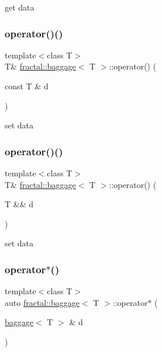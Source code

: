 get data 

\mbox{\label{classfractal_1_1baggage_a3c94a35a361859fd455047a044213d01}} 
\subsubsection{\texorpdfstring{operator()()}{operator()()}\hspace{0.1cm}{\footnotesize\ttfamily [2/3]}}
{\footnotesize\ttfamily template$<$class T$>$ \\
T\& \hyperlink{classfractal_1_1baggage}{fractal\+::baggage}$<$ T $>$\+::operator() (\begin{DoxyParamCaption}\item[{const T \&}]{d }\end{DoxyParamCaption})\hspace{0.3cm}{\ttfamily [inline]}}



set data 

\mbox{\label{classfractal_1_1baggage_a25086cfca4ea2ec94e9ee8965ce335c8}} 
\subsubsection{\texorpdfstring{operator()()}{operator()()}\hspace{0.1cm}{\footnotesize\ttfamily [3/3]}}
{\footnotesize\ttfamily template$<$class T$>$ \\
T\& \hyperlink{classfractal_1_1baggage}{fractal\+::baggage}$<$ T $>$\+::operator() (\begin{DoxyParamCaption}\item[{T \&\&}]{d }\end{DoxyParamCaption})\hspace{0.3cm}{\ttfamily [inline]}}



set data 

\mbox{\label{classfractal_1_1baggage_a65ff2c9d0b95c75913145564c916bb4e}} 
\subsubsection{\texorpdfstring{operator$\ast$()}{operator*()}\hspace{0.1cm}{\footnotesize\ttfamily [1/3]}}
{\footnotesize\ttfamily template$<$class T$>$ \\
auto \hyperlink{classfractal_1_1baggage}{fractal\+::baggage}$<$ T $>$\+::operator$\ast$ (\begin{DoxyParamCaption}\item[{\hyperlink{classfractal_1_1baggage}{baggage}$<$ T $>$ \&}]{d }\end{DoxyParamCaption})\hspace{0.3cm}{\ttfamily [inline]}}

